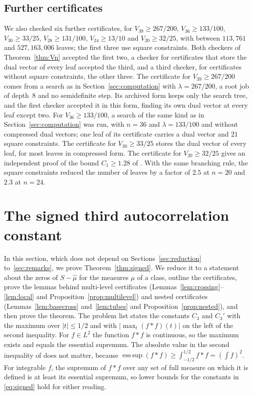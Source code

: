 \documentclass[11pt]{amsart}
\theoremstyle{definition}
\theoremstyle{remark}
\numberwithin{equation}{section}
\newcommand{\esssup}{\operatorname*{ess\,sup}}
\begin{document}
\subsection*{Further certificates} We also checked six further certificates, for $V_{39}\ge267/200$, $V_{36}\ge133/100$, $V_{30}\ge33/25$, $V_{28}\ge131/100$, $V_{24}\ge13/10$ and $V_{20}\ge32/25$, with between $113{,}761$ and $527{,}163{,}006$ leaves; the first three use square constraints. Both checkers of Theorem~\ref{thm:Vn} accepted the first two, a checker for certificates that store the dual vector of every leaf accepted the third, and a third checker, for certificates without square constraints, the other three. The certificate for $V_{39}\ge267/200$ comes from a search as in Section~\ref{sec:computation} with $\lambda=267/200$, a root job of depth~$8$ and no semidefinite step. Its archived form keeps only the search tree, and the first checker accepted it in this form, finding its own dual vector at every leaf except two. For $V_{36}\ge133/100$, a search of the same kind as in Section~\ref{sec:computation} was run, with $n=36$ and $\lambda=133/100$ and without compressed dual vectors; one leaf of its certificate carries a dual vector and $21$ square constraints. The certificate for $V_{30}\ge33/25$ stores the dual vector of every leaf, for most leaves in compressed form. The certificate for $V_{20}\ge32/25$ gives an independent proof of the bound $C_1\ge1.28$ of \cite{CS17}. With the same branching rule, the square constraints reduced the number of leaves by a factor of $2.5$ at $n=20$ and $2.3$ at $n=24$.



\section{The signed third autocorrelation constant}\label{sec:signed}

In this section, which does not depend on Sections~\ref{sec:reduction} to~\ref{sec:remarks}, we prove Theorem~\ref{thm:signed}. We reduce it to a statement about the zeros of $S-\hat\mu$ for the measures $\mu$ of a class, outline the certificates, prove the lemmas behind multi-level certificates (Lemmas~\ref{lem:crossing}--\ref{lem:local} and Proposition~\ref{prop:multilevel}) and nested certificates (Lemmas~\ref{lem:basecross} and~\ref{lem:tubes} and Proposition~\ref{prop:nested}), and then prove the theorem. The problem list \cite{GGTW25} states the constants $C_3$ and $C_3'$ with the maximum over $|t|\le1/2$ and with $|\max_t(f*f)(t)|$ on the left of the second inequality. For $f\in L^2$ the function $f*f$ is continuous, so the maximum exists and equals the essential supremum. The absolute value in the second inequality of \cite{GGTW25} does not matter, because $\esssup(f*f)\ge\int_{-1/2}^{1/2}f*f=(\int f)^2$. For integrable $f$, the supremum of $f*f$ over any set of full measure on which it is defined is at least its essential supremum, so lower bounds for the constants in \eqref{eq:signed} hold for either reading.
\end{document}
